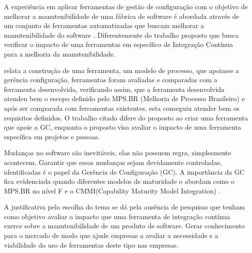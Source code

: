 A experiência em aplicar ferramentas  de gestão de configuração com o objetivo de melhorar a manutenibilidade de uma fábrica de software é abordada através de um conjunto de ferramentas automatizadas que buscam melhorar a manutenibilidade do software \cite{poliana2005}. Diferentemente do trabalho proposto que busca verificar o impacto de uma ferramentas em específico de Integração Contínua  para a melhoria da manutenibilidade.

\cite{furlaneto2006} relata a construção de uma ferramenta, um modelo de processo, que apoiasse a gerência configuração, ferramentas foram avaliadas e comparadas com a ferramenta desenvolvida, verificando assim, que a ferramenta desenvolvida atendeu bem o escopo definido pelo MPS.BR (Melhoria de Processo Brasileiro)  e após ser comparada com ferramentas existentes, esta conseguiu atender bem os requisitos definidos. O trabalho citado difere do proposto ao criar uma ferramenta que apoie a GC, enquanto o proposto visa avaliar o impacto de uma ferramenta específica em projetos e pessoas.

Mudanças no software são inevitáveis, elas não possuem regra, simplesmente acontecem. Garantir que essas mudanças sejam devidamente controladas, identificadas é o papel da  Gerência de Configuração (GC). A importância da GC fica evidenciada quando diferentes modelos de maturidade o abordam como o MPS.BR no nível F e o CMMI(Capability Maturity Model Integration) \cite{furlaneto2006}.

A justificativa pela escolha do tema se dá pela ausência de pesquisas que tenham como objetivo avaliar o impacto que uma ferramenta de integração contínua exerce sobre a manutenibilidade de um produto de software. Gerar conhecimento para o mercado de modo que ajude empresas a avaliar a necessidade e a viabilidade do uso de ferramentas deste tipo nas empresas.